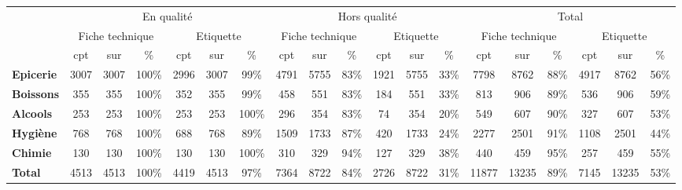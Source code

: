 \begin{tabular}{|l|ccc|ccc|ccc|ccc|ccc|ccc|}
\toprule
{} & \multicolumn{6}{c|}{En qualité} & \multicolumn{6}{c|}{Hors qualité} & \multicolumn{6}{c|}{Total} \\
{} & \multicolumn{3}{c}{Fiche technique} & \multicolumn{3}{c|}{Etiquette} & \multicolumn{3}{c}{Fiche technique} & \multicolumn{3}{c|}{Etiquette} & \multicolumn{3}{c}{Fiche technique} & \multicolumn{3}{c|}{Etiquette} \\
{} &             cpt &  sur &    \% &       cpt &  sur &    \% &             cpt &  sur &   \% &       cpt &  sur &   \% &             cpt &   sur &   \% &       cpt &   sur &   \% \\
\midrule
\textbf{Epicerie} &            3007 & 3007 & 100\% &      2996 & 3007 &  99\% &            4791 & 5755 & 83\% &      1921 & 5755 & 33\% &            7798 &  8762 & 88\% &      4917 &  8762 & 56\% \\
\textbf{Boissons} &             355 &  355 & 100\% &       352 &  355 &  99\% &             458 &  551 & 83\% &       184 &  551 & 33\% &             813 &   906 & 89\% &       536 &   906 & 59\% \\
\textbf{Alcools } &             253 &  253 & 100\% &       253 &  253 & 100\% &             296 &  354 & 83\% &        74 &  354 & 20\% &             549 &   607 & 90\% &       327 &   607 & 53\% \\
\textbf{Hygiène } &             768 &  768 & 100\% &       688 &  768 &  89\% &            1509 & 1733 & 87\% &       420 & 1733 & 24\% &            2277 &  2501 & 91\% &      1108 &  2501 & 44\% \\
\textbf{Chimie  } &             130 &  130 & 100\% &       130 &  130 & 100\% &             310 &  329 & 94\% &       127 &  329 & 38\% &             440 &   459 & 95\% &       257 &   459 & 55\% \\
\textbf{Total   } &            4513 & 4513 & 100\% &      4419 & 4513 &  97\% &            7364 & 8722 & 84\% &      2726 & 8722 & 31\% &           11877 & 13235 & 89\% &      7145 & 13235 & 53\% \\
\bottomrule
\end{tabular}
